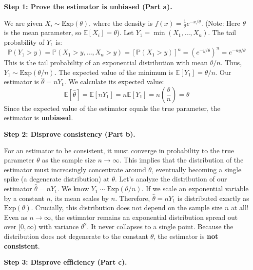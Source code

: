 \begin{solution}
\textbf{Step 1: Prove the estimator is unbiased (Part a).}

We are given $X_i \sim \text{Exp}(\theta)$, where the density is $f(x) = \frac{1}{\theta} e^{-x/\theta}$. (Note: Here $\theta$ is the mean parameter, so $\mathbb{E}[X_i] = \theta$).
Let $Y_1 = \min(X_1, \dots, X_n)$. The tail probability of $Y_1$ is:
\[ \mathbb{P}(Y_1 > y) = \mathbb{P}(X_1 > y, \dots, X_n > y) = \left[ \mathbb{P}(X_1 > y) \right]^n = \left( e^{-y/\theta} \right)^n = e^{-ny/\theta} \]
This is the tail probability of an exponential distribution with mean $\theta/n$. Thus, $Y_1 \sim \text{Exp}(\theta/n)$.
The expected value of the minimum is $\mathbb{E}[Y_1] = \theta/n$.
Our estimator is $\hat{\theta} = n Y_1$. We calculate its expected value:
\[ \mathbb{E}[\hat{\theta}] = \mathbb{E}[n Y_1] = n \mathbb{E}[Y_1] = n \left( \frac{\theta}{n} \right) = \theta \]
Since the expected value of the estimator equals the true parameter, the estimator is \textbf{unbiased}.

\textbf{Step 2: Disprove consistency (Part b).}

For an estimator to be consistent, it must converge in probability to the true parameter $\theta$ as the sample size $n \to \infty$. This implies that the distribution of the estimator must increasingly concentrate around $\theta$, eventually becoming a single spike (a degenerate distribution) at $\theta$.
Let's analyze the distribution of our estimator $\hat{\theta} = n Y_1$.
We know $Y_1 \sim \text{Exp}(\theta/n)$. If we scale an exponential variable by a constant $n$, its mean scales by $n$.
Therefore, $\hat{\theta} = n Y_1$ is distributed exactly as $\text{Exp}(\theta)$.
Crucially, this distribution does not depend on the sample size $n$ at all! Even as $n \to \infty$, the estimator remains an exponential distribution spread out over $[0, \infty)$ with variance $\theta^2$. It never collapses to a single point.
Because the distribution does not degenerate to the constant $\theta$, the estimator is \textbf{not consistent}.

\textbf{Step 3: Disprove efficiency (Part c).}


\end{solution}
